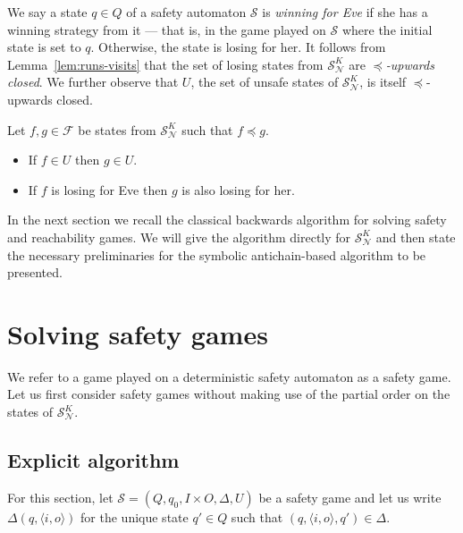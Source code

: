\documentclass[runningheads,a4paper,draft]{llncs}
\newcommand{\eve}{Eve\xspace}
\newcommand{\calN}{\mathcal{N}}
\newcommand{\calS}{\mathcal{S}}
\begin{document}
We say a state $q \in Q$ of a safety automaton $\calS$ is \emph{winning for \eve}
if she has a winning strategy from it --- that is, in the game played on
\(\calS\) where the initial state is set to \(q\). Otherwise, the
state is losing for her. It follows from Lemma~\ref{lem:runs-visits} that the set of
losing states from $\calS^K_\calN$ are \emph{$\preceq$-upwards closed}. We further
observe that $U$, the set of unsafe states of \(\calS^K_\calN\), is itself
$\preceq$-upwards closed.
\begin{proposition}\label{pro:up-closed}
  Let $f,g \in \mathcal{F}$ be states from $\calS^K_\calN$ such that $f
  \preceq g$.
  \begin{itemize}
    \item If $f \in U$ then $g \in U$.
    \item If $f$ is losing for \eve then $g$ is also losing for her.
  \end{itemize}
\end{proposition}

In the next section we recall the classical backwards algorithm for solving
safety and reachability games. We will give the algorithm directly for
$\calS^K_\calN$ and then state the necessary preliminaries for the symbolic
antichain-based algorithm to be presented.

\section{Solving safety games}
We refer to a game played on a deterministic safety automaton as a safety
game. Let us first consider safety games without making use of the partial order
on the states of \(\calS^K_\calN\).

\subsection{Explicit algorithm}
For this section, let $\calS = (Q,q_0, I \times O, \Delta, U)$ be a safety
game and let us write $\Delta(q,\langle i, o \rangle)$ for the unique state
$q' \in Q$ such that $(q, \langle i, o \rangle, q') \in \Delta$.
\end{document}
